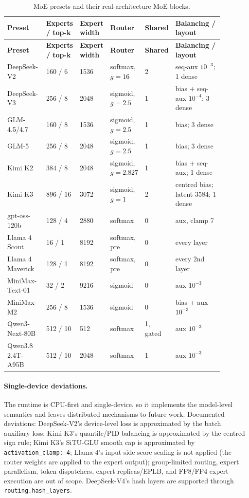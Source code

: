 {\small
\begin{longtable}{@{}L{0.18\linewidth}L{0.12\linewidth}L{0.10\linewidth}L{0.14\linewidth}L{0.12\linewidth}L{0.22\linewidth}@{}}
\caption{MoE presets and their real-architecture MoE blocks.}\label{tab:moe-presets}\\
\toprule
\textbf{Preset} & \textbf{Experts / top-k} & \textbf{Expert width} & \textbf{Router} & \textbf{Shared} & \textbf{Balancing / layout} \\
\midrule
\endfirsthead
\toprule
\textbf{Preset} & \textbf{Experts / top-k} & \textbf{Expert width} & \textbf{Router} & \textbf{Shared} & \textbf{Balancing / layout} \\
\midrule
\endhead
DeepSeek-V2 & 160 / 6 & 1536 & softmax, $g{=}16$ & 2 & seq-aux $10^{-3}$; 1 dense \\
DeepSeek-V3 & 256 / 8 & 2048 & sigmoid, $g{=}2.5$ & 1 & bias + seq-aux $10^{-4}$; 3 dense \\
GLM-4.5/4.7 & 160 / 8 & 1536 & sigmoid, $g{=}2.5$ & 1 & bias; 3 dense \\
GLM-5 & 256 / 8 & 2048 & sigmoid, $g{=}2.5$ & 1 & bias; 3 dense \\
Kimi K2 & 384 / 8 & 2048 & sigmoid, $g{=}2.827$ & 1 & bias + seq-aux; 1 dense \\
Kimi K3 & 896 / 16 & 3072 & sigmoid, $g{=}1$ & 2 & centred bias; latent 3584; 1 dense \\
gpt-oss-120b & 128 / 4 & 2880 & softmax & 0 & aux, clamp 7 \\
Llama 4 Scout & 16 / 1 & 8192 & softmax, pre & 0 & every layer \\
Llama 4 Maverick & 128 / 1 & 8192 & softmax, pre & 0 & every 2nd layer \\
MiniMax-Text-01 & 32 / 2 & 9216 & sigmoid & 0 & aux $10^{-3}$ \\
MiniMax-M2 & 256 / 8 & 1536 & sigmoid & 0 & bias + aux $10^{-3}$ \\
Qwen3-Next-80B & 512 / 10 & 512 & softmax & 1, gated & aux $10^{-3}$ \\
Qwen3.8 2.4T-A95B & 512 / 10 & 2048 & softmax & 1 & aux $10^{-3}$ \\
\bottomrule
\end{longtable}
}

\paragraph{Single-device deviations.}
The runtime is CPU-first and single-device, so it implements the model-level
semantics and leaves distributed mechanisms to future work. Documented
deviations: DeepSeek-V2's device-level loss is approximated by the batch
auxiliary loss; Kimi K3's quantile/PID balancing is approximated by the
centred sign rule; Kimi K3's SiTU-GLU smooth cap is approximated by
\texttt{activation\_clamp: 4}; Llama 4's input-side score scaling is not
applied (the router weights are applied to the expert output); group-limited
routing, expert parallelism, token dispatchers, expert replicas/EPLB, and
FP8/FP4 expert execution are out of scope. DeepSeek-V4's hash layers are
supported through \texttt{routing.hash\_layers}.

